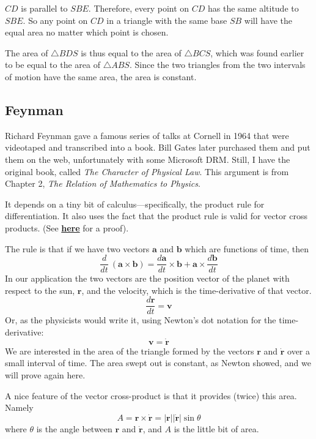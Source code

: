 \documentclass[11pt, oneside]{article}
\begin{document}
$CD$ is parallel to $SBE$.  Therefore, every point on $CD$ has the same altitude to $SBE$.  So any point on $CD$ in a triangle with the same base $SB$ will have the equal area no matter which point is chosen.

The area of $\triangle BDS$ is thus equal to the area of $\triangle BCS$, which was found earlier to be equal to the area of $\triangle ABS$.  Since the two triangles from the two intervals of motion have the same area, the area is constant.

\subsection*{Feynman}

Richard Feynman gave a famous series of talks at Cornell in 1964 that were videotaped and transcribed into a book.  Bill Gates later purchased them and put them on the web, unfortunately with some Microsoft DRM.  Still, I have the original book, called \emph{The Character of Physical Law}.  This argument is from Chapter 2, \emph{The Relation of Mathematics to Physics}.

It depends on a tiny bit of calculus---specifically, the product rule for differentiation.  It also uses the fact that the product rule is valid for vector cross products.  (See \hyperref[sec:Vector_cross_product]{\textbf{here}} for a proof).

The rule is that if we have two vectors $\mathbf{a}$ and $\mathbf{b}$ which are functions of time, then
\[ \frac{d}{dt} \ (\mathbf{a} \times \mathbf{b}) = \frac{d\mathbf{a}}{dt} \times \mathbf{b} + \mathbf{a}  \times \frac{d\mathbf{b}}{dt}    \]
In our application the two vectors are the position vector of the planet with respect to the sun, $\mathbf{r}$, and the velocity, which is the time-derivative of that vector.
\[ \frac{d\mathbf{r}}{dt} = \mathbf{v} \]
Or, as the physicists would write it, using Newton's dot notation for the time-derivative:
\[ \mathbf{v} = \dot{\mathbf{r}} \]
We are interested in the area of the triangle formed by the vectors $\mathbf{r}$ and $\dot{\mathbf{r}}$ over a small interval of time.  The area swept out is constant, as Newton showed, and we will prove again here.

A nice feature of the vector cross-product is that it provides (twice) this area.  Namely
\[ A =  \mathbf{r} \times \dot{\mathbf{r}} = |\mathbf{r}| |\dot{\mathbf{r}}| \sin \theta   \]
where $\theta$ is the angle between $\mathbf{r}$ and $\dot{\mathbf{r}}$, and $A$ is the little bit of area.
\end{document}
